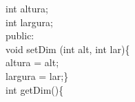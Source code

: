 \documentclass[12pt, a4paper]{article} %
\begin{document}
\begin{enumerate}
\begin{enumerate}
\begin{itemize}
\setlength{\parindent}{1cm} int altura; \\[-0.5cm]

\setlength{\parindent}{1cm} int largura; \\[-0.5cm]

\setlength{\parindent}{1cm} public: \\[-0.5cm]

\setlength{\parindent}{2cm} void setDim (int alt, int lar)\{ \\[-0.5cm]

\setlength{\parindent}{3cm} altura = alt; \\[-0.5cm]

\setlength{\parindent}{3cm} largura = lar;\} \\[-0.5cm]

\setlength{\parindent}{2cm} int getDim()\{ \\[-0.5cm]


\end{itemize}
\end{enumerate}
\end{enumerate}
\end{document}
